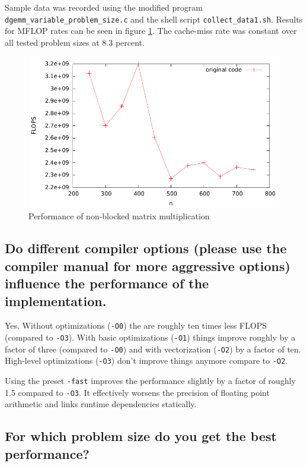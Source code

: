 \documentclass[11pt]{article}
\begin{document}
Sample data was recorded using the modified program \texttt{dgemm\_variable\_problem\_size.c} and the shell script \texttt{collect\_data1.sh}. Results for MFLOP rates can be seen in figure \ref{unblocked}. The cache-miss rate was constant over all tested problem sizes at 8.3 percent.

\begin{figure}[h]
  \begin{center}
    \includegraphics{../graphics/graph_unblocked.pdf}
    \caption{Performance of non-blocked matrix multiplication}
    \label{unblocked}
  \end{center}
\end{figure}

\subsection*{Do different compiler options (please use the compiler manual for more aggressive options) influence the performance of the implementation.}

Yes. Without optimizations (\texttt{-O0}) the are roughly ten times less FLOPS (compared to \texttt{-O3}). With basic optimizations (\texttt{-O1}) things improve roughly by a factor of three (compared to \texttt{-O0}) and with vectorization (\texttt{-O2}) by a factor of ten. High-level optimizations (\texttt{-O3}) don't improve things anymore compare to \texttt{-O2}.

Using the preset \texttt{-fast} improves the performance slightly by a factor of roughly 1.5 compared to \texttt{-O3}. It effectively worsens the precision of floating point arithmetic and links runtime dependencies statically.

\subsection*{For which problem size do you get the best performance?}
\end{document}
